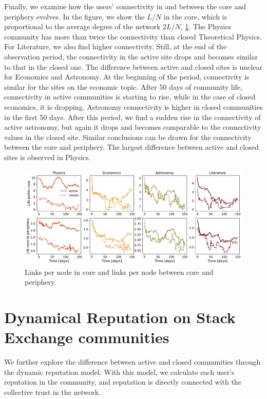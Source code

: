Finally, we examine how the users’ connectivity in and between the core and periphery evolves. In the figure, we show the $L/N$ in the core, which is proportional to the average degree of the network $2L/N$, \ref{fig:links_per_node}. The Physics community has more than twice the connectivity than closed Theoretical Physics. For Literature, we also find higher connectivity. Still, at the end of the observation period, the connectivity in the active site drops and becomes similar to that in the closed one. The difference between active and closed sites is unclear for Economics and Astronomy. At the beginning of the period, connectivity is similar for the sites on the economic topic. After 50 days of community life, connectivity in active communities is starting to rise, while in the case of closed economics, it is dropping. Astronomy connectivity is higher in closed communities in the first 50 days. After this period, we find a sudden rise in the connectivity of active astronomy, but again it drops and becomes comparable to the connectivity values in the closed site. Similar conclusions can be drawn for the connectivity between the core and periphery. The largest difference between active and closed sites is observed in Physics.  

\begin{figure}[h]
	\centering
	\includegraphics[width=\linewidth]{figures/stackexchange/core_connectivity.pdf}
	\caption{Links per node in core and links per node between core and periphery.}
	\label{fig:links_per_node}
\end{figure}

\section{Dynamical Reputation on Stack Exchange communities}

We further explore the difference between active and closed communities through the dynamic reputation model. With this model, we calculate each user's reputation in the community, and reputation is directly connected with the collective trust in the network. 

